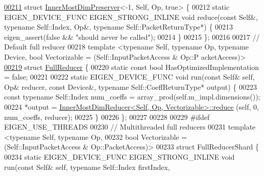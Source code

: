 \begin{DoxyCode}
\hyperlink{struct_eigen_1_1internal_1_1_inner_most_dim_preserver_3-1_00_01_self_00_01_op_00_01true_01_4}{00211} \textcolor{keyword}{struct }\hyperlink{struct_eigen_1_1internal_1_1_inner_most_dim_preserver}{InnerMostDimPreserver}<-1, Self, Op, true> \{
00212   \textcolor{keyword}{static} EIGEN\_DEVICE\_FUNC EIGEN\_STRONG\_INLINE \textcolor{keywordtype}{void} reduce(\textcolor{keyword}{const} Self&, \textcolor{keyword}{typename} Self::Index, Op&, \textcolor{keyword}{typename}
       Self::PacketReturnType*) \{
00213     eigen\_assert(\textcolor{keyword}{false} && \textcolor{stringliteral}{"should never be called"});
00214   \}
00215 \};
00216 
00217 \textcolor{comment}{// Default full reducer}
00218 \textcolor{keyword}{template} <\textcolor{keyword}{typename} Self, \textcolor{keyword}{typename} Op, \textcolor{keyword}{typename} Device, \textcolor{keywordtype}{bool} Vectorizable = (Self::InputPacketAccess & Op::P
      acketAccess)>
\hyperlink{struct_eigen_1_1internal_1_1_full_reducer}{00219} \textcolor{keyword}{struct }\hyperlink{struct_eigen_1_1internal_1_1_full_reducer}{FullReducer} \{
00220   \textcolor{keyword}{static} \textcolor{keyword}{const} \textcolor{keywordtype}{bool} HasOptimizedImplementation = \textcolor{keyword}{false};
00221 
00222   \textcolor{keyword}{static} EIGEN\_DEVICE\_FUNC \textcolor{keywordtype}{void} run(\textcolor{keyword}{const} Self& \textcolor{keyword}{self}, Op& reducer, \textcolor{keyword}{const} Device&, \textcolor{keyword}{typename} 
      Self::CoeffReturnType* output) \{
00223     \textcolor{keyword}{const} \textcolor{keyword}{typename} Self::Index num\_coeffs = array\_prod(\textcolor{keyword}{self}.m\_impl.dimensions());
00224     *output = \hyperlink{struct_eigen_1_1internal_1_1_inner_most_dim_reducer}{InnerMostDimReducer<Self, Op, Vectorizable>::reduce}
      (\textcolor{keyword}{self}, 0, num\_coeffs, reducer);
00225   \}
00226 \};
00227 
00228 
00229 \textcolor{preprocessor}{#ifdef EIGEN\_USE\_THREADS}
00230 \textcolor{comment}{// Multithreaded full reducers}
00231 \textcolor{keyword}{template} <\textcolor{keyword}{typename} Self, \textcolor{keyword}{typename} Op,
00232           \textcolor{keywordtype}{bool} Vectorizable = (Self::InputPacketAccess & Op::PacketAccess)>
00233 \textcolor{keyword}{struct} FullReducerShard \{
00234   \textcolor{keyword}{static} EIGEN\_DEVICE\_FUNC EIGEN\_STRONG\_INLINE \textcolor{keywordtype}{void} run(\textcolor{keyword}{const} Self& \textcolor{keyword}{self}, \textcolor{keyword}{typename} Self::Index firstIndex,

\end{DoxyCode}
